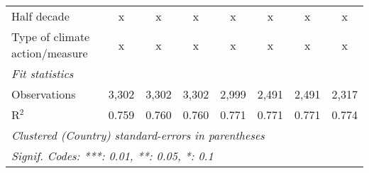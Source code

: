 \begin{tabular}{lccccccc}
   Half decade                                                                      & x             & x             & x             & x             & x             & x             & x\\  
   Type of climate action/measure                                                   & x             & x             & x             & x             & x             & x             & x\\  
   \midrule \emph{Fit statistics}\\
   Observations                                                                     & 3,302         & 3,302         & 3,302         & 2,999         & 2,491         & 2,491         & 2,317\\  
   R$^2$                                                                            & 0.759         & 0.760         & 0.760         & 0.771         & 0.771         & 0.771         & 0.774\\  
   \midrule
   \multicolumn{8}{l}{\emph{Clustered (Country) standard-errors in parentheses}}\\
   \multicolumn{8}{l}{\emph{Signif. Codes: ***: 0.01, **: 0.05, *: 0.1}}\\
\end{tabular}
\par\endgroup


